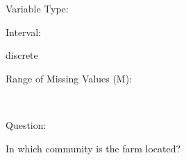 \documentclass[
]{article}
\begin{document}
\begin{minipage}[t]{0.3\linewidth}

Variable Type:

\end{minipage}%
\begin{minipage}[t]{0.7\linewidth}

\end{minipage}

\begin{minipage}[t]{0.3\linewidth}

Interval:

\end{minipage}%
\begin{minipage}[t]{0.7\linewidth}

discrete

\end{minipage}

\begin{minipage}[t]{0.3\linewidth}

Range of Missing Values (M):

\end{minipage}%
\begin{minipage}[t]{0.7\linewidth}

~

\end{minipage}

\begin{minipage}[t]{0.3\linewidth}

Question:

\end{minipage}%
\begin{minipage}[t]{0.7\linewidth}

In which community is the farm located?

\end{minipage}
\end{document}
